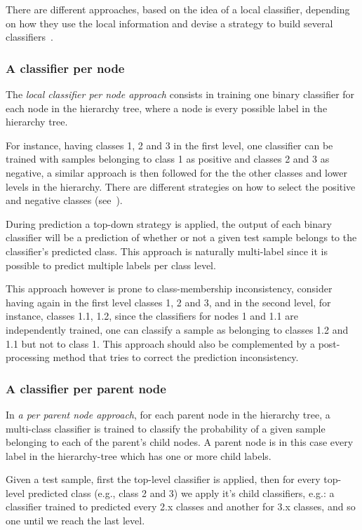 \documentclass[11pt,a4paper]{article}
\begin{document}
There are different approaches, based on the idea of a local classifier, depending on how they use
the local information and devise a strategy to build several classifiers~\cite{Silla:2011:SHC:1937796.1937884}.


\subsubsection{A classifier per node} %
The \textit{local classifier per node approach} consists in training one binary classifier for each
node in the hierarchy tree, where a node is every possible label in the hierarchy tree.

For instance, having classes 1, 2 and 3 in the first level, one classifier can be trained with
samples belonging to class 1 as positive and classes 2 and 3 as negative, a similar approach is then
followed for the the other classes and lower levels in the hierarchy. There are different strategies
on how to select the positive and negative classes (see~\cite{}).

During prediction a top-down strategy is applied, the output of each binary classifier will be a
prediction of whether or not a given test sample belongs to the classifier’s predicted class. This
approach is naturally multi-label since it is possible to predict multiple labels per class level.

This approach however is prone to class-membership inconsistency, consider having again in the first
level classes 1, 2 and 3, and in the second level, for instance, classes 1.1, 1.2, since the
classifiers for nodes 1 and 1.1 are independently trained, one can classify a sample as belonging to
classes 1.2 and 1.1 but not to class 1. This approach should also be complemented by a
post-processing method that tries to correct the prediction inconsistency.


\subsubsection{A classifier per parent node} %
In \textit{a per parent node approach}, for each parent node in the hierarchy tree, a multi-class
classifier is trained to classify the probability of a given sample belonging to each of the parent's
child nodes. A parent node is in this case every label in the hierarchy-tree which has one or more
child labels.

Given a test sample, first the top-level classifier is applied, then for every top-level
predicted class (e.g., class 2 and 3) we apply it's child classifiers, e.g.: a classifier
trained to predicted every 2.x classes and another for 3.x classes, and so one until we reach the
last level.
\end{document}
